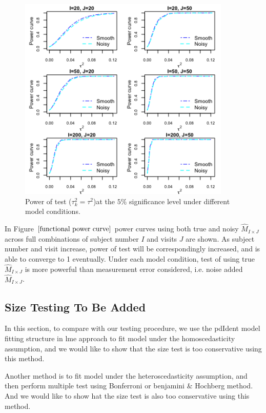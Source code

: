 \begin{figure}[h!]
\centering
\includegraphics[width=0.9\textwidth]{powercurve.png}
\caption{Power of test ($\tau_k^2=\tau^2$)at the $5\%$ significance level under different model conditions.}
\label{functional power curve}
\end{figure}
In Figure $\ref{functional power curve}$ power curves using both true and noisy $\hat{M}_{I\times J}$ across full combinations of subject number $I$ and visits $J$ are shown. As subject number and visit increase, power of test will be correspondingly increased, and is able to converge to 1 eventually. Under each model condition, test of using true $\hat{M}_{I\times J}$ is more powerful than measurement error considered, i.e. noise added $\hat{M}_{I\times J}$.
\newpage
\subsection{Size Testing To Be Added}
In this section, to compare with our testing procedure, we use the pdIdent model fitting structure in lme approach to fit model under the homoscedasticity assumption, and we would like to show that the size test is too conservative using this method. 

Another method is to fit model under the heteroscedasticity assumption, and then perform multiple test using Bonferroni or benjamini $\&$ Hochberg method.  And we would like to show 
hat the size test is also too conservative using this method. 

